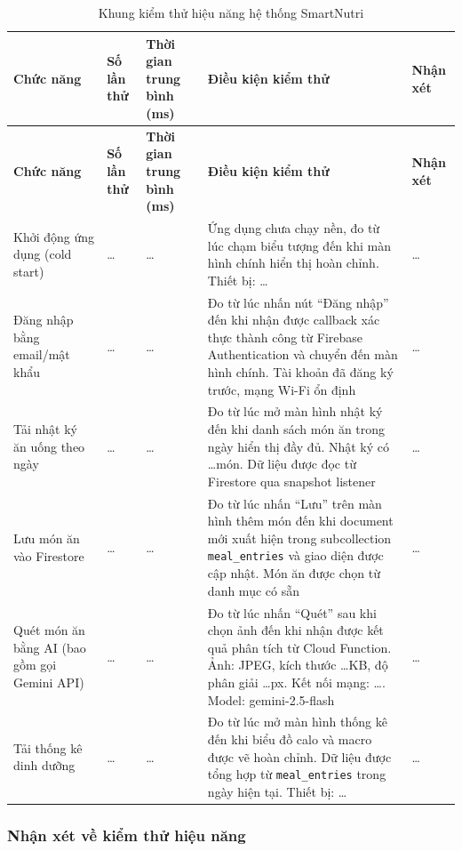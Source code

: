 \begingroup
\small
\begin{longtable}{|p{3.2cm}|p{1.5cm}|p{2.5cm}|p{4cm}|p{3.5cm}|}
    \caption{Khung kiểm thử hiệu năng hệ thống SmartNutri}
    \label{tab:performance_test} \\
    \hline
    \textbf{Chức năng} & \textbf{Số lần thử} & \textbf{Thời gian trung bình (ms)} & \textbf{Điều kiện kiểm thử} & \textbf{Nhận xét} \\
    \hline
    \endfirsthead
    \hline
    \textbf{Chức năng} & \textbf{Số lần thử} & \textbf{Thời gian trung bình (ms)} & \textbf{Điều kiện kiểm thử} & \textbf{Nhận xét} \\
    \hline
    \endhead
    \hline
    \endfoot
    Khởi động ứng dụng (cold start) & \ldots & \ldots & Ứng dụng chưa chạy nền, đo từ lúc chạm biểu tượng đến khi màn hình chính hiển thị hoàn chỉnh. Thiết bị: \ldots & \ldots \\
    \hline
    Đăng nhập bằng email/mật khẩu & \ldots & \ldots & Đo từ lúc nhấn nút ``Đăng nhập'' đến khi nhận được callback xác thực thành công từ Firebase Authentication và chuyển đến màn hình chính. Tài khoản đã đăng ký trước, mạng Wi-Fi ổn định & \ldots \\
    \hline
    Tải nhật ký ăn uống theo ngày & \ldots & \ldots & Đo từ lúc mở màn hình nhật ký đến khi danh sách món ăn trong ngày hiển thị đầy đủ. Nhật ký có \ldots món. Dữ liệu được đọc từ Firestore qua snapshot listener & \ldots \\
    \hline
    Lưu món ăn vào Firestore & \ldots & \ldots & Đo từ lúc nhấn ``Lưu'' trên màn hình thêm món đến khi document mới xuất hiện trong subcollection \texttt{meal\_entries} và giao diện được cập nhật. Món ăn được chọn từ danh mục có sẵn & \ldots \\
    \hline
    Quét món ăn bằng AI (bao gồm gọi Gemini API) & \ldots & \ldots & Đo từ lúc nhấn ``Quét'' sau khi chọn ảnh đến khi nhận được kết quả phân tích từ Cloud Function. Ảnh: JPEG, kích thước \ldots KB, độ phân giải \ldots px. Kết nối mạng: \ldots. Model: gemini-2.5-flash & \ldots \\
    \hline
    Tải thống kê dinh dưỡng & \ldots & \ldots & Đo từ lúc mở màn hình thống kê đến khi biểu đồ calo và macro được vẽ hoàn chỉnh. Dữ liệu được tổng hợp từ \texttt{meal\_entries} trong ngày hiện tại. Thiết bị: \ldots & \ldots \\
    \hline
\end{longtable}
\endgroup

\subsubsection{Nhận xét về kiểm thử hiệu năng}

